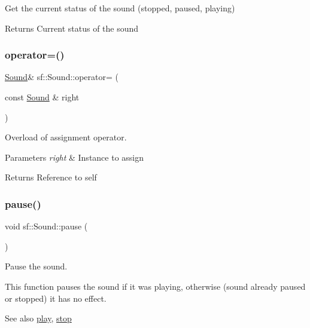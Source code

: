 Get the current status of the sound (stopped, paused, playing) 

\begin{DoxyReturn}{Returns}
Current status of the sound 
\end{DoxyReturn}
\mbox{\label{classsf_1_1_sound_a08c64c9c1dabeebc59fbf2540d81d4dd}} 
\subsubsection{\texorpdfstring{operator=()}{operator=()}}
{\footnotesize\ttfamily \hyperlink{classsf_1_1_sound}{Sound}\& sf\+::\+Sound\+::operator= (\begin{DoxyParamCaption}\item[{const \hyperlink{classsf_1_1_sound}{Sound} \&}]{right }\end{DoxyParamCaption})}



Overload of assignment operator. 


\begin{DoxyParams}{Parameters}
{\em right} & Instance to assign\\
\hline
\end{DoxyParams}
\begin{DoxyReturn}{Returns}
Reference to self 
\end{DoxyReturn}
\mbox{\label{classsf_1_1_sound_a5eeb25815bfa8cdc4a6cc000b7b19ad5}} 
\subsubsection{\texorpdfstring{pause()}{pause()}}
{\footnotesize\ttfamily void sf\+::\+Sound\+::pause (\begin{DoxyParamCaption}{ }\end{DoxyParamCaption})}



Pause the sound. 

This function pauses the sound if it was playing, otherwise (sound already paused or stopped) it has no effect.

\begin{DoxySeeAlso}{See also}
\hyperlink{classsf_1_1_sound_a2953ffe632536e72e696fd880ced2532}{play}, \hyperlink{classsf_1_1_sound_aa9c91c34f7c6d344d5ee9b997511f754}{stop} 
\end{DoxySeeAlso}
\mbox{\label{classsf_1_1_sound_a2953ffe632536e72e696fd880ced2532}} 
